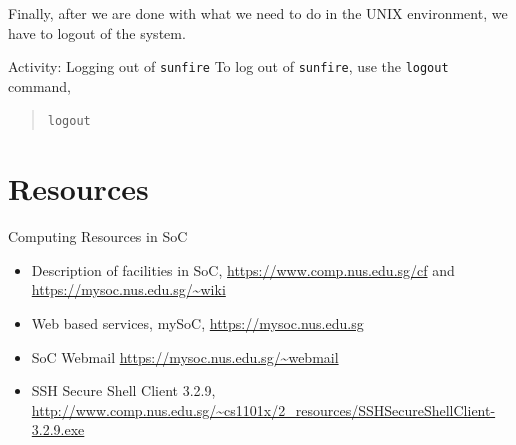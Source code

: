 \documentclass[a4paper]{beamer}
\newcommand{\cmd}[1]{\begin{quote}{\tt #1}\end{quote}}
\begin{document}
Finally, after we are done with what we need to do in the UNIX environment, we
have to logout of the system.  

\begin{frame}{Activity: Logging out of \texttt{sunfire}}
To log out of \texttt{sunfire}, use the \texttt{logout} command, \cmd{logout}
\end{frame}

\section{Resources}

\begin{frame}{Computing Resources in SoC}
\begin{itemize}
\item Description of facilities in SoC, \url{https://www.comp.nus.edu.sg/cf} and \url{https://mysoc.nus.edu.sg/~wiki}
\item Web based services, mySoC, \url{https://mysoc.nus.edu.sg}
\item SoC Webmail \url{https://mysoc.nus.edu.sg/~webmail}
\item SSH Secure Shell Client 3.2.9, \url{http://www.comp.nus.edu.sg/~cs1101x/2_resources/SSHSecureShellClient-3.2.9.exe}
\end{itemize}
\end{frame}
\end{document}
